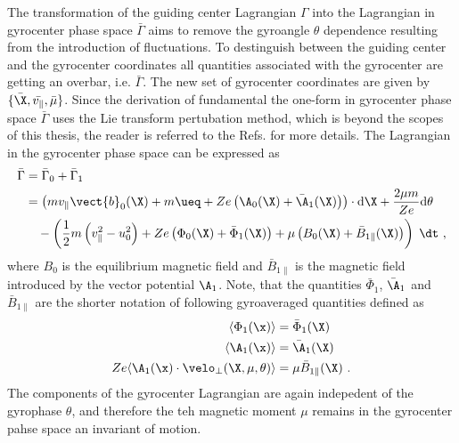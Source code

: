The transformation of the guiding center Lagrangian $\Gamma$ into the Lagrangian in gyrocenter phase space $\bar{\Gamma}$ aims to remove the gyroangle $\theta$ dependence resulting from the introduction of fluctuations. To destinguish between the guiding center and the gyrocenter coordinates all quantities associated with the gyrocenter are getting an overbar, i.e. $\bar{\Gamma}$.  The new set of gyrocenter coordinates are given by $\{\bar{\X}, \bar{v_\parallel}, \bar{\mu}\}$. Since the derivation of fundamental the one-form in gyrocenter phase space $\bar{\Gamma}$ uses the Lie transform pertubation method, which is beyond the scopes of this thesis, the reader is referred to the Refs.  for more details. The Lagrangian in the gyrocenter phase space can be expressed as
\begin{gather}
    \begin{aligned}
        \bar{\Gamma} &= \bar{\Gamma}_0 + \bar{\Gamma}_1 \\
                     &= \left(mv_\parallel \vect{b}_0(\X) + m\ueq + Ze\left(\A_0(\X) + \bar{\A}_1(\X)\right)\right) \cdot \mathrm{d}\X + \frac{2\mu m}{Ze} \mathrm{d}\theta \\
                     &\quad - \left(\frac{1}{2} m \left(v_\parallel^2 - u_0^2 \right) + Ze \left(\Phi_0(\X) + \bar{\Phi}_1(\X)\right) + \mu\left(B_0(\X) + \bar{B}_{1\parallel}(\X)\right)\right)\;\dt~,
    \end{aligned}
    \label{eq:gyrocenterPertrubationLagrangian}
\end{gather}
where $B_0$ is the equilibrium magnetic field and $\bar{B}_{1\parallel}$ is the magnetic field introduced by the vector potential $\A_1$. Note, that the quantities $\bar{\Phi}_1$, $\bar{\A}_1$ and $\bar{B}_{1\parallel}$ are the shorter notation of following gyroaveraged quantities defined as
\begin{gather}
    \begin{aligned}
        \langle \Phi_1(\x) \rangle &= \bar{\Phi}_1(\X) \\
        \langle \A_1(\x)   \rangle &= \bar{\A}_1(\X) \\ 
        Ze \langle \A_1(\x) \cdot \velo_\perp (\X,\mu,\theta) \rangle &= \mu\bar{B}_{1\parallel}(\X)~.
    \end{aligned}
    \label{eq:gyrocenterGyroaveragedQuantities}
\end{gather} 
The components of the gyrocenter Lagrangian are again indepedent of the gyrophase $\theta$, and therefore the teh magnetic moment $\mu$ remains in the gyrocenter pahse space an invariant of motion.


\newpage